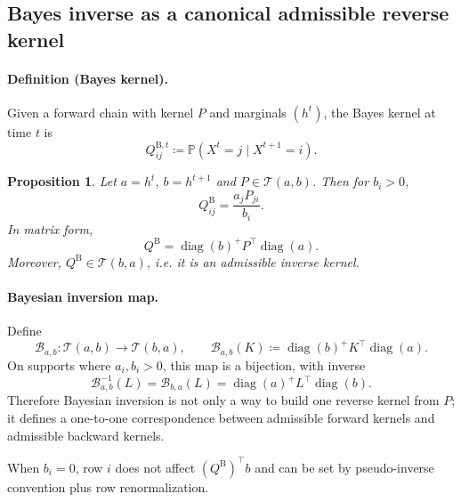 \documentclass[11pt]{article}
\newcommand{\diag}{\operatorname{diag}}
\newcommand{\Tset}{\mathcal{T}}
\newtheorem{proposition}{Proposition}
\begin{document}
\subsection{Bayes inverse as a canonical admissible reverse kernel}
\paragraph{Definition (Bayes kernel).}
Given a forward chain with kernel $P$ and marginals $(h^t)$, the Bayes kernel at time $t$ is
\[
Q^{\mathrm B,t}_{ij}\coloneqq
\mathbb{P}(X^t=j\mid X^{t+1}=i).
\]

\begin{proposition}
Let $a=h^t$, $b=h^{t+1}$ and $P\in\Tset(a,b)$. Then for $b_i>0$,
\begin{equation}
\label{eq:bayes-entry}
Q^{\mathrm B}_{ij}=\frac{a_jP_{ji}}{b_i}.
\end{equation}
In matrix form,
\begin{equation}
\label{eq:bayes-diag}
Q^{\mathrm B}=\diag(b)^+P^\top\diag(a).
\end{equation}
Moreover, $Q^{\mathrm B}\in\Tset(b,a)$, i.e. it is an admissible inverse kernel.
\end{proposition}

\paragraph{Bayesian inversion map.}
Define
\[
\mathcal B_{a,b}:\Tset(a,b)\to\Tset(b,a),\qquad
\mathcal B_{a,b}(K)\coloneqq \diag(b)^+K^\top\diag(a).
\]
On supports where $a_i,b_i>0$, this map is a bijection, with inverse
\[
\mathcal B_{a,b}^{-1}(L)=\mathcal B_{b,a}(L)=\diag(a)^+L^\top\diag(b).
\]
Therefore Bayesian inversion is not only a way to build one reverse kernel from $P$; it defines a one-to-one correspondence between admissible forward kernels and admissible backward kernels.

When $b_i=0$, row $i$ does not affect $(Q^{\mathrm B})^\top b$ and can be set by pseudo-inverse convention plus row renormalization.
\end{document}
